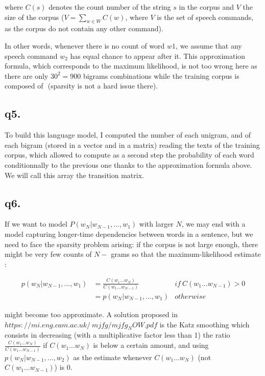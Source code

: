 \documentclass[11pt]{article}
\begin{document}
  where $C(s)$ denotes the count number of the string $s$ in the corpus and $V$ the size of the corpus ($V = \sum_{w \in W} C(w)$, where $V$ is the set of speech commands, as the corpus do not contain any other command).
  
  In other words, whenever there is no count of word $w1$, we assume that any speech command $w_2$ has equal chance to appear after it.
  This approximation formula, which corresponds to the maximum likelihood, is not too wrong here as there are only $30^2=900$ bigrams combinations while the training corpus is composed of $ $ (sparsity is not a hard issue there).
  
  \subsection*{q5.}
  
  To build this language model, I computed the number of each unigram, and of each bigram (stored in a vector and in a matrix) reading the texts of the training corpus, which allowed to compute as a second step the probability of each word conditionnally to the previous one thanks to the approximation formula above. We will call this array the transition matrix.
  
  \subsection*{q6.}
  
  If we want to model $P(w_N|w_{N-1},...,w_1)$ with larger $N$, we may end with a model capturing longer-time dependencies between words in a sentence, but we need to face the sparsity problem arising: if the corpus is not large enough, there might be very few counts of $N-$ grams so that the maximum-likelihood estimate :
  
    \begin{align} p(w_N|w_{N-1},...,w_1) &= \frac{C(w_1...w_{N})}{C(w_1...w_{N-1})} & if ~ C(w_1...w_{N-1})>0 \\
  &= p(w_N|w_{N-1},...,w_1)  & otherwise
  \end{align}
  
might become too approximate. A solution proposed in $https://mi.eng.cam.ac.uk/~mjfg/mjfg_NOW.pdf$ is the Katz smoothing which consists in decreasing (with a multiplicative factor less than 1) the ratio $\frac{C(w_1...w_{N})}{C(w_1...w_{N-1})}$ if $C(w_1...w_{N})$ is below a certain amount, and using $ p(w_N|w_{N-1},...,w_2)$ as the estimate whenever $C(w_1...w_{N})$ (not $C(w_1...w_{N-1})$) is 0.
  
\end{document}
